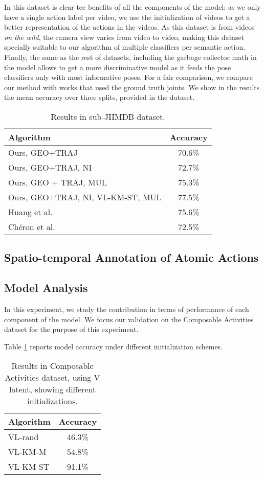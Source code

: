 In this dataset is clear tee benefits of all the components of the model: as we only have a single action label per video, we use the initialization of videos to get a better representation of the actions in the videos. As this dataset is from videos \emph{on the wild}, the camera view varies from video to video, making this dataset specially suitable to our algorithm of multiple classifiers per semantic action. Finally, the same as the rest of datasets, including the garbage collector math in the model allows to get a more discriminative model as it feeds the pose classifiers only with most informative poses. For a fair comparison, we compare our method with works that used the ground truth joints. We show in the results the mean accuracy over three splits, provided in the dataset.

\begin{table}
\centering
\begin{tabular}{|l|c|}
\hline
\textbf{Algorithm} & \textbf{Accuracy}\\
\hline
Ours, GEO+TRAJ & 70.6\%\\
Ours, GEO+TRAJ, NI & 72.7\% \\
Ours, GEO + TRAJ, MUL & 75.3\%\\
Ours, GEO+TRAJ, NI, VL-KM-ST, MUL &  77.5\% \\
\hline
Huang et al. \cite{Jhuang2013} & 75.6\% \\
Ch\'eron et al. \cite{Cheron2015} & 72.5\%\\
\hline
\end{tabular}
\caption{Results in sub-JHMDB dataset. }
\end{table}


\subsection{Spatio-temporal Annotation of Atomic Actions}

\subsection{Model Analysis}
In this experiment,
we study the contribution in terms of performance of each component of the
model.
We focus our validation on the Composable Activities dataset for the purpose
of this experiment.

Table \ref{tab:initialization} reports model accuracy under different initialization
schemes.

\begin{table}
\centering
\begin{tabular}{|l|c|}
\hline
\textbf{Algorithm} & \textbf{Accuracy}\\
\hline
VL-rand   & 46.3\% \\
VL-KM-M   & 54.8\% \\
VL-KM-ST   & 91.1\% \\
\hline
\end{tabular}
\caption{Results in Composable Activities dataset, using V latent, showing different initializations. }
\label{tab:initialization}
\end{table}


